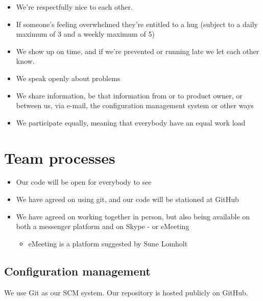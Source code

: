 \documentclass[a4paper,11pt]{article}
\begin{document}
\begin{itemize}
	\item We're respectfully nice to each other.

  	\item If someone's feeling overwhelmed they're entitled to a hug (subject to a daily maximum of 3 and a weekly maximum of 5)

  	\item We show up on time, and if we're prevented or running late we let each other know.

  	\item We speak openly about problems

  	\item We share information, be that information from or to product owner, or between us, via e-mail, the configuration management system or other ways

  	\item We participate equally, meaning that everybody have an equal work load
\end{itemize}


\section{Team processes} %
\label{sec:team_processes}

\begin{itemize}
	\item Our code will be open for everybody to see
	
	\item We have agreed on using git, and our code will be stationed at GitHub
	
	\item We have agreed on working together in person, but also being available on both a messenger platform and on Skype - or eMeeting
	\begin{itemize}
		\item eMeeting is a platform suggested by Sune Lomholt
	\end{itemize}
\end{itemize}

\subsection{Configuration management} %
\label{subsec:configuration_management}

We use Git as our SCM system. 
Our repository is hosted publicly on GitHub.
\end{document}
